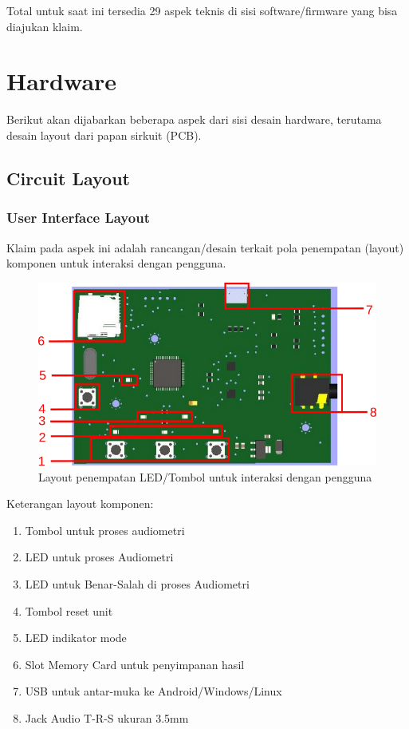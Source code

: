 \documentclass[12pt,]{article}
\begin{document}
	Total untuk saat ini tersedia 29 aspek teknis di sisi software/firmware yang bisa diajukan klaim.

	\newpage
	\section{Hardware}
	Berikut akan dijabarkan beberapa aspek dari sisi desain hardware,
	terutama desain layout dari papan sirkuit (PCB).
	
	\subsection{Circuit Layout}
	
	\subsubsection{User Interface Layout}
	
	Klaim pada aspek ini adalah rancangan/desain terkait pola penempatan 
	(layout) komponen untuk interaksi dengan pengguna.
	
	\begin{figure}[!ht]
		\centering
		\includegraphics[width=400pt]{images/layout}
		\caption{Layout penempatan LED/Tombol untuk interaksi dengan pengguna}
	\end{figure}

	Keterangan layout komponen:
	\begin{enumerate}
		\item Tombol untuk proses audiometri
		
		\item LED untuk proses Audiometri
		
		\item LED untuk Benar-Salah di proses Audiometri
		
		\item Tombol reset unit
		
		\item LED indikator mode
		
		\item Slot Memory Card untuk penyimpanan hasil
		
		\item USB untuk antar-muka ke Android/Windows/Linux
		
		\item Jack Audio T-R-S ukuran 3.5mm
	\end{enumerate}
\end{document}
